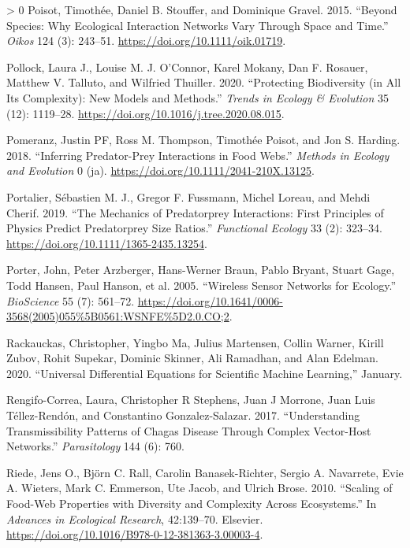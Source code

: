 \documentclass[10pt,oneside]{article}
\newlength{\cslhangindent}
\newenvironment{CSLReferences}[3] %
 {%
  \setlength{\parindent}{0pt}
  \ifodd #1 \everypar{\setlength{\hangindent}{\cslhangindent}}\ignorespaces\fi
  \ifnum #2 > 0
  \setlength{\parskip}{#2\baselineskip}
  \fi
 }%
 {}
\begin{document}
\begin{CSLReferences}{1}{0}
\leavevmode\hypertarget{ref-Poisot2015SpeWhy}{}%
Poisot, Timothée, Daniel B. Stouffer, and Dominique Gravel. 2015.
{``Beyond Species: Why Ecological Interaction Networks Vary Through
Space and Time.''} \emph{Oikos} 124 (3): 243--51.
\url{https://doi.org/10.1111/oik.01719}.

\leavevmode\hypertarget{ref-Pollock2020ProBio}{}%
Pollock, Laura J., Louise M. J. O'Connor, Karel Mokany, Dan F. Rosauer,
Matthew V. Talluto, and Wilfried Thuiller. 2020. {``Protecting
Biodiversity (in All Its Complexity): New Models and Methods.''}
\emph{Trends in Ecology \& Evolution} 35 (12): 1119--28.
\url{https://doi.org/10.1016/j.tree.2020.08.015}.

\leavevmode\hypertarget{ref-Pomeranz2018InfPre}{}%
Pomeranz, Justin PF, Ross M. Thompson, Timothée Poisot, and Jon S.
Harding. 2018. {``Inferring Predator-Prey Interactions in Food Webs.''}
\emph{Methods in Ecology and Evolution} 0 (ja).
\url{https://doi.org/10.1111/2041-210X.13125}.

\leavevmode\hypertarget{ref-Portalier2019MecPre}{}%
Portalier, Sébastien M. J., Gregor F. Fussmann, Michel Loreau, and Mehdi
Cherif. 2019. {``The Mechanics of Predatorprey Interactions: First
Principles of Physics Predict Predatorprey Size Ratios.''}
\emph{Functional Ecology} 33 (2): 323--34.
\url{https://doi.org/10.1111/1365-2435.13254}.

\leavevmode\hypertarget{ref-Porter2005WirSen}{}%
Porter, John, Peter Arzberger, Hans-Werner Braun, Pablo Bryant, Stuart
Gage, Todd Hansen, Paul Hanson, et al. 2005. {``Wireless Sensor Networks
for Ecology.''} \emph{BioScience} 55 (7): 561--72.
\url{https://doi.org/10.1641/0006-3568(2005)055\%5B0561:WSNFE\%5D2.0.CO;2}.

\leavevmode\hypertarget{ref-Rackauckas2020UniDif}{}%
Rackauckas, Christopher, Yingbo Ma, Julius Martensen, Collin Warner,
Kirill Zubov, Rohit Supekar, Dominic Skinner, Ali Ramadhan, and Alan
Edelman. 2020. {``Universal Differential Equations for Scientific
Machine Learning,''} January.

\leavevmode\hypertarget{ref-Rengifo-Correa2017UndTra}{}%
Rengifo-Correa, Laura, Christopher R Stephens, Juan J Morrone, Juan Luis
Téllez-Rendón, and Constantino Gonzalez-Salazar. 2017. {``Understanding
Transmissibility Patterns of Chagas Disease Through Complex Vector-Host
Networks.''} \emph{Parasitology} 144 (6): 760.

\leavevmode\hypertarget{ref-Riede2010ScaFoo}{}%
Riede, Jens O., Björn C. Rall, Carolin Banasek-Richter, Sergio A.
Navarrete, Evie A. Wieters, Mark C. Emmerson, Ute Jacob, and Ulrich
Brose. 2010. {``Scaling of Food-Web Properties with Diversity and
Complexity Across Ecosystems.''} In \emph{Advances in Ecological
Research}, 42:139--70. Elsevier.
\url{https://doi.org/10.1016/B978-0-12-381363-3.00003-4}.


\end{CSLReferences}
\end{document}
